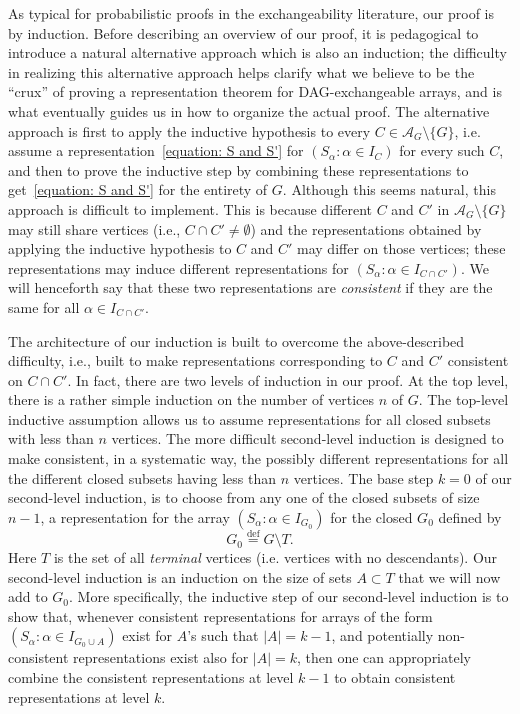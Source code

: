 \documentclass[AHL,Unicode,longabstracts,published]{cedram}
\newcommand*{\defeq}{\stackrel{\mathrm{def}}{=}}
\renewcommand{\AA}{\mathcal{A}}
\begin{document}
As typical for probabilistic proofs in the exchangeability literature, our proof is by induction. Before describing an overview of our proof, it is pedagogical to introduce a natural alternative approach which is also an induction; the difficulty in realizing this alternative approach helps clarify what we believe to be the ``crux'' of proving a representation theorem for DAG-exchangeable arrays, and is what eventually guides us in how to organize the actual proof. The alternative approach is first to apply the inductive hypothesis to every $C \in \AA_G \setminus \{G\}$, i.e. assume a representation~\eqref{equation: S and S'} for $(S_\alpha : \alpha \in I_C)$ for every such $C$, and then to prove the inductive step by combining these representations to get~\eqref{equation: S and S'} for the entirety of $G$. Although this seems natural, this approach is difficult to implement. This is because different $C$ and $C'$ in $\AA_G \setminus \{G\}$ may still share vertices (i.e., $C \cap C' \neq \emptyset$) and the representations obtained by applying the inductive hypothesis to $C$ and $C'$ may differ on those vertices; these representations may induce different representations for $(S_\alpha : \alpha \in I_{C \cap C'})$. We will henceforth say that these two representations are \emph{consistent} if they are the same for all $\alpha \in I_{C \cap C'}$.

The architecture of our induction is built to overcome the above-described difficulty, i.e., built to make representations corresponding to $C$ and $C'$ consistent on $C\cap C'$. In fact, there are two levels of induction in our proof. At the top level, there is a rather simple induction on the number of vertices $n$ of $G$. The top-level inductive assumption allows us to assume representations for all closed subsets with less than $n$ vertices. The more difficult second-level induction is designed to make consistent, in a systematic way, the possibly different representations for all the different closed subsets having less than $n$ vertices. The base step $k=0$ of our second-level induction, is to choose from any one of the closed subsets of size $n-1$, a representation for the array $(S_\alpha : \alpha \in I_{G_0})$ for the closed $G_0$ defined by
\begin{equation}\label{eqn:notation:G0}
G_0
\defeq G\setminus T.
\end{equation}
Here $T$ is the set of all \emph{terminal} vertices (i.e. vertices with no descendants). Our second-level induction is an induction on the size of sets $A\subset T$ that we will now add to $G_0$. More specifically, the inductive step of our second-level induction is to show that, whenever consistent representations for arrays of the form $(S_\alpha : \alpha \in I_{G_0\cup A})$ exist for $A$'s such that $|A|=k-1$, and potentially non-consistent representations exist also for $|A|=k$, then one can appropriately combine the consistent representations at level $k-1$ to obtain consistent representations at level $k$.
\end{document}
